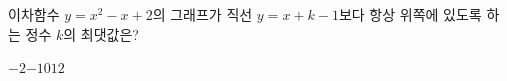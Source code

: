 \hspace*{2mm}\begin{minipage}[t]{\dimexpr\linewidth-2mm\relax}\vspace{0pt}
이차함수 $y=x^2-x+2$의 그래프가 직선 $y=x+k-1$보다 항상 위쪽에 있도록 하는 정수 $k$의 최댓값은?
\begin{choices32}{$-2$}{$-1$}{$0$}{$1$}{$2$}\end{choices32}\end{minipage}
